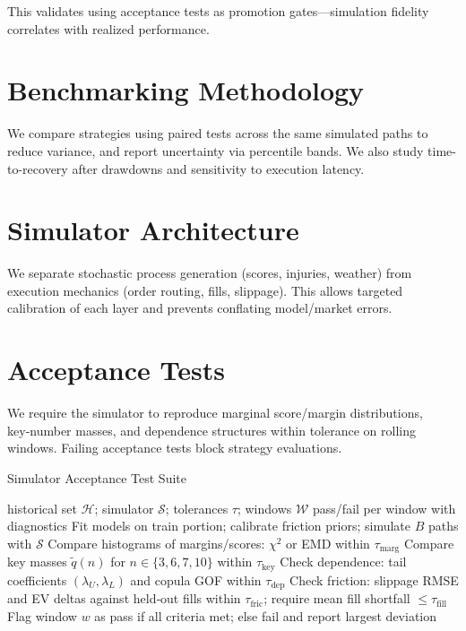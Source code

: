 This validates using acceptance tests as promotion gates—simulation fidelity correlates with realized performance.


\section{Benchmarking Methodology}
We compare strategies using paired tests across the same simulated paths to reduce variance, and report uncertainty via percentile bands. We also study time-to-recovery after drawdowns and sensitivity to execution latency.

\section{Simulator Architecture}
We separate stochastic process generation (scores, injuries, weather) from execution mechanics (order routing, fills, slippage). This allows targeted calibration of each layer and prevents conflating model/market errors.

\section{Acceptance Tests}
We require the simulator to reproduce marginal score/margin distributions, key‑number masses, and dependence structures within tolerance on rolling windows. Failing acceptance tests block strategy evaluations.

\begin{algorithm}[t]
  \caption{Simulator Acceptance Test Suite}
  \label{alg:sim-accept}
  \begin{algorithmic}[1]
    \Require historical set $\mathcal H$; simulator $\mathcal S$; tolerances $\tau$; windows $\mathcal W$
    \Ensure pass/fail per window with diagnostics
      \State Fit models on train portion; calibrate friction priors; simulate $B$ paths with $\mathcal S$
      \State Compare histograms of margins/scores: $\chi^2$ or EMD within $\tau_{\text{marg}}$
      \State Compare key masses $\tilde q(n)$ for $n\in\{3,6,7,10\}$ within $\tau_{\text{key}}$
      \State Check dependence: tail coefficients $(\lambda_U,\lambda_L)$ and copula GOF within $\tau_{\text{dep}}$
      \State Check friction: slippage RMSE and EV deltas against held‑out fills within $\tau_{\text{fric}}$; require mean fill shortfall $\le \tau_{\text{fill}}$
      \State Flag window $w$ as pass if all criteria met; else fail and report largest deviation
    \EndFor
  \end{algorithmic}
\end{algorithm}

